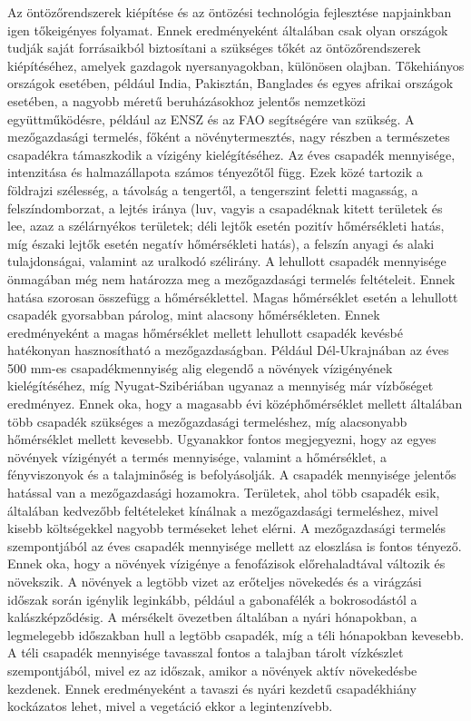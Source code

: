 \documentclass[a4paper,oneside,onecolumn,12pt]{LegrandOrangeBook}
\begin{document}
Az öntözőrendszerek kiépítése és az öntözési technológia fejlesztése napjainkban igen tőkeigényes folyamat. Ennek eredményeként általában csak olyan országok tudják saját forrásaikból biztosítani a szükséges tőkét az öntözőrendszerek kiépítéséhez, amelyek gazdagok nyersanyagokban, különösen olajban. Tőkehiányos országok esetében, például India, Pakisztán, Banglades és egyes afrikai országok esetében, a nagyobb méretű beruházásokhoz jelentős nemzetközi együttműködésre, például az ENSZ és az FAO segítségére van szükség.
A mezőgazdasági termelés, főként a növénytermesztés, nagy részben a természetes csapadékra támaszkodik a vízigény kielégítéséhez. 
Az éves csapadék mennyisége, intenzitása és halmazállapota számos tényezőtől függ. Ezek közé tartozik a földrajzi szélesség, a távolság a tengertől, a tengerszint feletti magasság, a felszíndomborzat, a lejtés iránya (luv, vagyis a csapadéknak kitett területek és lee, azaz a szélárnyékos területek; déli lejtők esetén pozitív hőmérsékleti hatás, míg északi lejtők esetén negatív hőmérsékleti hatás), a felszín anyagi és alaki tulajdonságai, valamint az uralkodó szélirány. 
A lehullott csapadék mennyisége önmagában még nem határozza meg a mezőgazdasági termelés feltételeit. Ennek hatása szorosan összefügg a hőmérséklettel. Magas hőmérséklet esetén a lehullott csapadék gyorsabban párolog, mint alacsony hőmérsékleten. Ennek eredményeként a magas hőmérséklet mellett lehullott csapadék kevésbé hatékonyan hasznosítható a mezőgazdaságban. Például Dél-Ukrajnában az éves 500 mm-es csapadékmennyiség alig elegendő a növények vízigényének kielégítéséhez, míg Nyugat-Szibériában ugyanaz a mennyiség már vízbőséget eredményez. Ennek oka, hogy a magasabb évi középhőmérséklet mellett általában több csapadék szükséges a mezőgazdasági termeléshez, míg alacsonyabb hőmérséklet mellett kevesebb. Ugyanakkor fontos megjegyezni, hogy az egyes növények vízigényét a termés mennyisége, valamint a hőmérséklet, a fényviszonyok és a talajminőség is befolyásolják.
A csapadék mennyisége jelentős hatással van a mezőgazdasági hozamokra. Területek, ahol több csapadék esik, általában kedvezőbb feltételeket kínálnak a mezőgazdasági termeléshez, mivel kisebb költségekkel nagyobb terméseket lehet elérni. A mezőgazdasági termelés szempontjából az éves csapadék mennyisége mellett az eloszlása is fontos tényező. Ennek oka, hogy a növények vízigénye a fenofázisok előrehaladtával változik és növekszik. A növények a legtöbb vizet az erőteljes növekedés és a virágzási időszak során igénylik leginkább, például a gabonafélék a bokrosodástól a kalászképződésig.
A mérsékelt övezetben általában a nyári hónapokban, a legmelegebb időszakban hull a legtöbb csapadék, míg a téli hónapokban kevesebb. A téli csapadék mennyisége tavasszal fontos a talajban tárolt vízkészlet szempontjából, mivel ez az időszak, amikor a növények aktív növekedésbe kezdenek. Ennek eredményeként a tavaszi és nyári kezdetű csapadékhiány kockázatos lehet, mivel a vegetáció ekkor a legintenzívebb.
\end{document}

